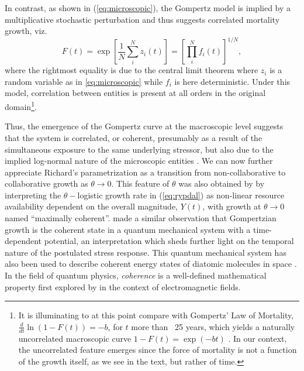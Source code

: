 \documentclass{article}
\begin{document}
In contrast, as shown in (\ref{eq:microscopic}), the Gompertz model is implied by a multiplicative stochastic perturbation and thus suggests correlated mortality growth, viz.
\begin{equation}
F(t) = \exp{\left[\frac{1}{N}\sum_i^N z_i(t)\right]} = \left[\prod_i^N f_i(t)\right]^{1/N},
\end{equation}
where the rightmost equality is due to the central limit theorem where $z_i$ is a random variable as in \ref{eq:microscopic} while $f_i$ is here deterministic. 
Under this model, correlation between entities is present at all orders in the original domain\footnote{It is illuminating to at this point compare with Gompertz' Law of Mortality, $\frac{d}{dt}\ln{(1 - F(t))} = -b$, for $t$ more than ~25 years, which yields a naturally uncorrelated macroscopic curve $1 - F(t) = \exp{(-bt)}$ \citep{shklovskii2005simple}. 
In our context, the uncorrelated feature emerges since the force of mortality is not a function of the growth itself, as we see in the text, but rather of time.}.

Thus, the emergence of the Gompertz curve at the macroscopic level suggests that the system is correlated, or coherent, presumably as a result of the simultaneous exposure to the same underlying stressor, but also due to the implied log-normal nature of the microscopic entities \citep{zhang1994log}.
We can now further appreciate Richard's parametrization as a transition from non-collaborative to collaborative growth as $\theta \rightarrow 0$. 
This feature of $\theta$ was also obtained by \citet{petroni2020logistic} by interpreting the $\theta-$logistic growth rate in (\ref{eq:rypdal}) as non-linear resource availability dependent on the overall magnitude, $Y(t)$, with growth at $\theta \rightarrow 0$ named ``maximally coherent''. 
\citet{molski2003coherent} made a similar observation that Gompertzian growth is the coherent state in a quantum mechanical system with a time-dependent potential, an interpretation which sheds further light on the temporal nature of the postulated stress response.
This quantum mechanical system has also been used to describe coherent energy states of diatomic molecules in space \citep{morse1929diatomic}. 
In the field of quantum physics, \emph{coherence} is a well-defined mathematical property first explored by \citet{glauber1963coherent} in the context of electromagnetic fields.
\end{document}
